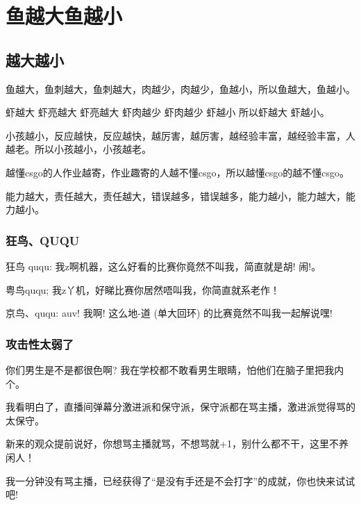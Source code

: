
\iffalse
\fi


\chapter{鱼越大鱼越小}

\section{越大越小}

鱼越大，鱼刺越大，鱼刺越大，肉越少，肉越少，鱼越小，所以鱼越大，鱼越小\cite{zhang2010tree}。

虾越大 虾亮越大 虾亮越大 虾肉越少 虾肉越少 虾越小 所以虾越大 虾越小。

小孩越小，反应越快，反应越快，越厉害，越厉害，越经验丰富，越经验丰富，人越老。所以小孩越小，小孩越老。

越懂csgo的人作业越寄，作业趣寄的人越不懂csgo，所以越懂csgo的越不懂csgo。

能力越大，责任越大，责任越大，错误越多，错误越多，能力越小，能力越大，能力越小。

\subsection{狂鸟、QUQU}

狂鸟 ququ: 我z啊机器，这么好看的比赛你竟然不叫我，简直就是胡! 闹!\cite{deng:01a}。

粤鸟ququ; 我z丫机，好睇比赛你居然唔叫我，你简直就系老作！

京鸟、ququ: auv! 我啊! 这么地-道 (单大回环) 的比赛竟然不叫我一起解说嘿! 

\subsection{攻击性太弱了}

你们男生是不是都很色啊? 我在学校都不敢看男生眼睛，怕他们在脑子里把我内个。

我看明白了，直播间弹幕分激进派和保守派，保守派都在骂主播，激进派觉得骂的太保守。

新来的观众提前说好，你想骂主播就骂，不想骂就+1，别什么都不干，这里不养闲人！

我一分钟没有骂主播，已经获得了“是没有手还是不会打字”的成就，你也快来试试吧!

